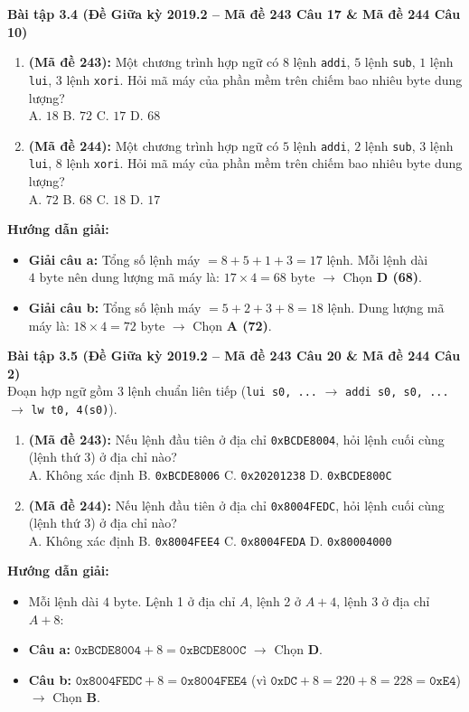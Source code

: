 \textbf{Bài tập 3.4 (Đề Giữa kỳ 2019.2 -- Mã đề 243 Câu 17 \& Mã đề 244 Câu 10)}
\begin{enumerate}[label=\alph*)]
    \item \textbf{(Mã đề 243):} Một chương trình hợp ngữ có $8$ lệnh \texttt{addi}, $5$ lệnh \texttt{sub}, $1$ lệnh \texttt{lui}, $3$ lệnh \texttt{xori}. Hỏi mã máy của phần mềm trên chiếm bao nhiêu byte dung lượng?\\
    A. $18$ \quad B. $72$ \quad C. $17$ \quad D. $68$
    \item \textbf{(Mã đề 244):} Một chương trình hợp ngữ có $5$ lệnh \texttt{addi}, $2$ lệnh \texttt{sub}, $3$ lệnh \texttt{lui}, $8$ lệnh \texttt{xori}. Hỏi mã máy của phần mềm trên chiếm bao nhiêu byte dung lượng?\\
    A. $72$ \quad B. $68$ \quad C. $18$ \quad D. $17$
\end{enumerate}
\textbf{Hướng dẫn giải:}
\begin{itemize}
    \item \textbf{Giải câu a:} Tổng số lệnh máy $= 8 + 5 + 1 + 3 = 17\text{ lệnh}$. Mỗi lệnh dài $4\text{ byte}$ nên dung lượng mã máy là: $17 \times 4 = 68\text{ byte}$ $\rightarrow$ Chọn \textbf{D (68)}.
    \item \textbf{Giải câu b:} Tổng số lệnh máy $= 5 + 2 + 3 + 8 = 18\text{ lệnh}$. Dung lượng mã máy là: $18 \times 4 = 72\text{ byte}$ $\rightarrow$ Chọn \textbf{A (72)}.
\end{itemize}

\textbf{Bài tập 3.5 (Đề Giữa kỳ 2019.2 -- Mã đề 243 Câu 20 \& Mã đề 244 Câu 2)}\\
Đoạn hợp ngữ gồm 3 lệnh chuẩn liên tiếp (\texttt{lui s0, ...} $\rightarrow$ \texttt{addi s0, s0, ...} $\rightarrow$ \texttt{lw t0, 4(s0)}).
\begin{enumerate}[label=\alph*)]
    \item \textbf{(Mã đề 243):} Nếu lệnh đầu tiên ở địa chỉ \texttt{0xBCDE8004}, hỏi lệnh cuối cùng (lệnh thứ 3) ở địa chỉ nào?\\
    A. Không xác định \quad B. \texttt{0xBCDE8006} \quad C. \texttt{0x20201238} \quad D. \texttt{0xBCDE800C}
    \item \textbf{(Mã đề 244):} Nếu lệnh đầu tiên ở địa chỉ \texttt{0x8004FEDC}, hỏi lệnh cuối cùng (lệnh thứ 3) ở địa chỉ nào?\\
    A. Không xác định \quad B. \texttt{0x8004FEE4} \quad C. \texttt{0x8004FEDA} \quad D. \texttt{0x80004000}
\end{enumerate}
\textbf{Hướng dẫn giải:}
\begin{itemize}
    \item Mỗi lệnh dài $4\text{ byte}$. Lệnh 1 ở địa chỉ $A$, lệnh 2 ở $A + 4$, lệnh 3 ở địa chỉ $A + 8$:
    \item \textbf{Câu a:} $\texttt{0xBCDE8004} + 8 = \texttt{0xBCDE800C}$ $\rightarrow$ Chọn \textbf{D}.
    \item \textbf{Câu b:} $\texttt{0x8004FEDC} + 8 = \texttt{0x8004FEE4}$ (vì $\texttt{0xDC} + 8 = 220 + 8 = 228 = \texttt{0xE4}$) $\rightarrow$ Chọn \textbf{B}.
\end{itemize}

